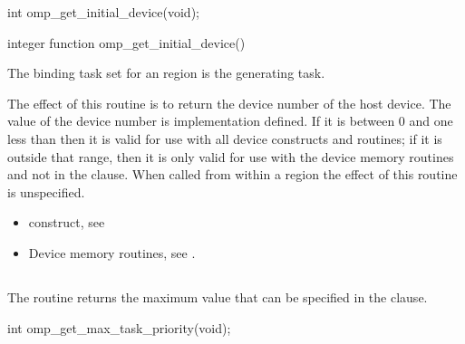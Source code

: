 \pagebreak

\begin{samepage}
\format
\ccppspecificstart
\begin{boxedcode}
int omp\_get\_initial\_device(void);
\end{boxedcode}
\ccppspecificend
\end{samepage}

\fortranspecificstart
\begin{boxedcode}
integer function omp\_get\_initial\_device()
\end{boxedcode}
\fortranspecificend

\binding
The binding task set for an  region is the generating task.

\effect
The effect of this routine is to return the device number of the host device.
The value of the device number is implementation defined. If it is between 0 
and one less than  then it is valid for use 
with all device constructs and routines; if it is outside that range, then 
it is only valid for use with the device memory routines and not in the 
 clause. When called from within a  region 
the effect of this routine is unspecified.

\crossreferences
\begin{itemize}
\item {} construct, see 

\item Device memory routines, see .
\end{itemize}




\subsection{}
\label{subsec:omp_get_max_task_priority}
\summary

The  routine returns the maximum value that can be
specified in the  clause.

\pagebreak

\begin{samepage}
\format
\ccppspecificstart
\begin{boxedcode}
int omp\_get\_max\_task\_priority(void);
\end{boxedcode}
\ccppspecificend
\end{samepage}

